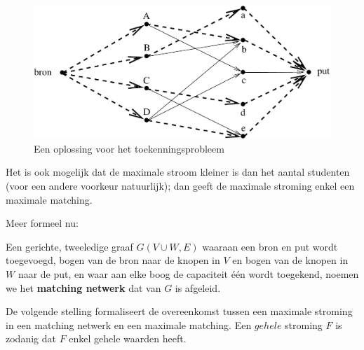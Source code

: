 \begin{figure}[ht]
\begin{center}
\includegraphics[width=0.5\linewidth,keepaspectratio]{matching3} %
\end{center}
\caption{Een oplossing voor het toekenningsprobleem \label{matching3}}
\end{figure}

Het is ook mogelijk dat de maximale stroom kleiner is dan het aantal
studenten (voor een andere voorkeur natuurlijk); dan geeft de maximale
stroming enkel een maximale matching.

Meer formeel nu:


Een gerichte, tweeledige graaf $G(V \cup W,E)$ waaraan een bron en put
wordt toegevoegd, bogen van de bron naar de knopen in $V$ en bogen van
de knopen in $W$ naar de put, en waar aan elke boog de capaciteit
\'{e}\'{e}n wordt toegekend, noemen we het \textbf{matching netwerk}
dat van $G$ is afgeleid.



De volgende stelling formaliseert de overeenkomst tussen een maximale
stroming in een matching netwerk en een maximale matching.
Een $gehele$ stroming $F$ is zodanig dat $F$ enkel gehele waarden heeft.

